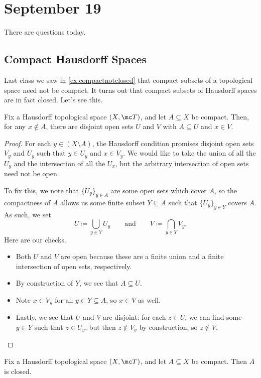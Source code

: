 \documentclass[../notes.tex]{subfiles}
\begin{document}
\section{September 19}

There are questions today.

\subsection{Compact Hausdorff Spaces}
Last class we saw in \autoref{ex:compactnotclosed} that compact subsets of a topological space need not be compact. It turns out that compact subsets of Hausdorff spaces are in fact closed. Let's see this.
\begin{lemma} \label{lem:separationforcompacthaus}
	Fix a Hausdorff topological space $(X,\mc T)$, and let $A\subseteq X$ be compact. Then, for any $x\notin A$, there are disjoint open sets $U$ and $V$ with $A\subseteq U$ and $x\in V$.
\end{lemma}
\begin{proof}
	For each $y\in(X\setminus A)$, the Hausdorff condition promises disjoint open sets $V_y$ and $U_y$ such that $y\in U_y$ and $x\in V_y$. We would like to take the union of all the $U_y$ and the intersection of all the $U_x$, but the arbitrary intersection of open sets need not be open.

	To fix this, we note that $\{U_y\}_{y\in A}$ are some open sets which cover $A$, so the compactness of $A$ allows us some finite subset $Y\subseteq A$ such that $\{U_y\}_{y\in Y}$ covers $A$. As such, we set
	\[U\coloneqq\bigcup_{y\in Y}U_y\qquad\text{and}\qquad V\coloneqq\bigcap_{y\in Y}V_y.\]
	Here are our checks.
	\begin{itemize}
		\item Both $U$ and $V$ are open because these are a finite union and a finite intersection of open sets, respectively.
		\item By construction of $Y$, we see that $A\subseteq U$.
		\item Note $x\in V_y$ for all $y\in Y\subseteq A$, so $x\in V$ as well.
		\item Lastly, we see that $U$ and $V$ are disjoint: for each $z\in U$, we can find some $y\in Y$ such that $z\in U_y$, but then $z\notin V_y$ by construction, so $z\notin V$.
		\qedhere
	\end{itemize}
\end{proof}
\begin{corollary} \label{cor:compact-in-haus-is-closed}
	Fix a Hausdorff topological space $(X,\mc T)$, and let $A\subseteq X$ be compact. Then $A$ is closed.
\end{corollary}
\end{document}
